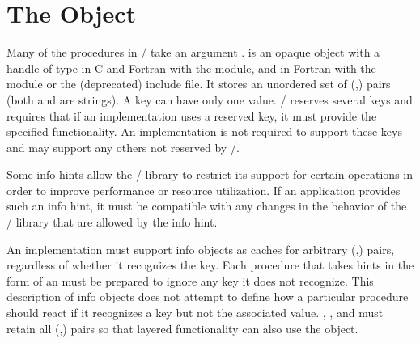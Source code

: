 
\chapter{The \texorpdfstring{}{Info} Object}
\label{sec:misc-2}
\label{chap:misc-2}




\label{subsec:info}
\label{chap:info}

Many of the procedures in 
\MPI/ 
take an argument
.  is an opaque object with a handle of type
%
 in C and Fortran with the  module, 
and 
 in Fortran with the  module or the (deprecated)  include file. 
It stores an unordered set of
(,) pairs (both  and
 are strings). 
A key 
can
have only one
value. \MPI/ reserves several keys and requires that if an
implementation uses a reserved key, it must provide the specified
functionality.  An implementation is not required to support these
keys and may support any others not reserved by \MPI/.

Some info hints allow the \MPI/ library to
restrict its support for certain operations
in order to improve performance or resource utilization.  If an
application provides such an info hint, it must be compatible with
any changes in the behavior of the \MPI/ library that are allowed by the info
hint.


An implementation must support info objects as caches for arbitrary (,) pairs, regardless of whether it recognizes the key. Each procedure that
takes hints in the form of an  must be prepared to ignore any key it
does not recognize. This description of info objects does not attempt to
define how a particular procedure should react if it recognizes a key but not the
associated value. 
, ,
and 
must retain all (,)
pairs so that layered functionality can also use the  object. 

